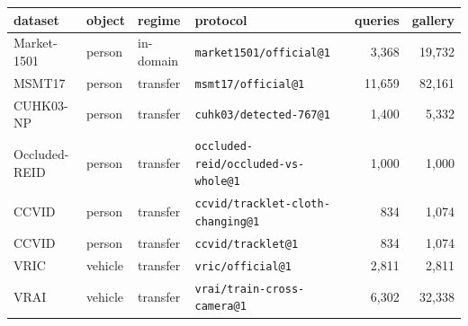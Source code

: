 \begin{tabular}{llllrr}
\toprule
dataset & object & regime & protocol & queries & gallery \\
\midrule
Market-1501 & person & in-domain & \texttt{market1501/official@1} & 3,368 & 19,732 \\
MSMT17 & person & transfer & \texttt{msmt17/official@1} & 11,659 & 82,161 \\
CUHK03-NP & person & transfer & \texttt{cuhk03/detected-767@1} & 1,400 & 5,332 \\
Occluded-REID & person & transfer & \texttt{occluded-reid/occluded-vs-whole@1} & 1,000 & 1,000 \\
CCVID & person & transfer & \texttt{ccvid/tracklet-cloth-changing@1} & 834 & 1,074 \\
CCVID & person & transfer & \texttt{ccvid/tracklet@1} & 834 & 1,074 \\
VRIC & vehicle & transfer & \texttt{vric/official@1} & 2,811 & 2,811 \\
VRAI & vehicle & transfer & \texttt{vrai/train-cross-camera@1} & 6,302 & 32,338 \\
\bottomrule
\end{tabular}
